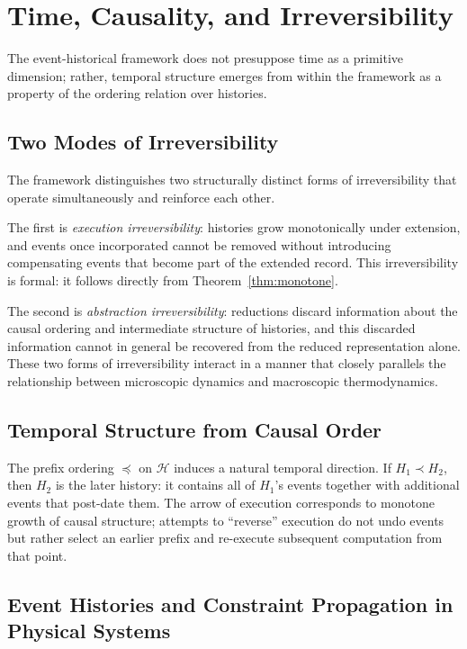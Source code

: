 \documentclass[12pt]{article}
\begin{document}
\section{Time, Causality, and Irreversibility}
\label{sec:time}

The event-historical framework does not presuppose time as a primitive dimension; rather,
temporal structure emerges from within the framework as a property of the ordering relation
over histories.

\subsection{Two Modes of Irreversibility}

The framework distinguishes two structurally distinct forms of irreversibility that operate
simultaneously and reinforce each other.

The first is \emph{execution irreversibility}: histories grow monotonically under extension,
and events once incorporated cannot be removed without introducing compensating events that
become part of the extended record. This irreversibility is formal: it follows directly from
Theorem~\ref{thm:monotone}.

The second is \emph{abstraction irreversibility}: reductions discard information about the
causal ordering and intermediate structure of histories, and this discarded information cannot
in general be recovered from the reduced representation alone. These two forms of irreversibility
interact in a manner that closely parallels the relationship between microscopic dynamics and
macroscopic thermodynamics.

\subsection{Temporal Structure from Causal Order}

The prefix ordering $\preceq$ on $\mathcal{H}$ induces a natural temporal direction. If
$H_1 \prec H_2$, then $H_2$ is the later history: it contains all of $H_1$'s events together
with additional events that post-date them. The arrow of execution corresponds to monotone
growth of causal structure; attempts to ``reverse'' execution do not undo events but rather
select an earlier prefix and re-execute subsequent computation from that point.

\subsection{Event Histories and Constraint Propagation in Physical Systems}
\end{document}
